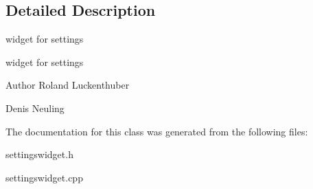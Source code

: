 \subsection{\-Detailed \-Description}
widget for settings 

widget for settings

\begin{DoxyAuthor}{\-Author}
\-Roland \-Luckenthuber 

\-Denis \-Neuling 
\end{DoxyAuthor}


\-The documentation for this class was generated from the following files\-:\begin{DoxyCompactItemize}
\item 
settingswidget.\-h\item 
settingswidget.\-cpp\end{DoxyCompactItemize}
